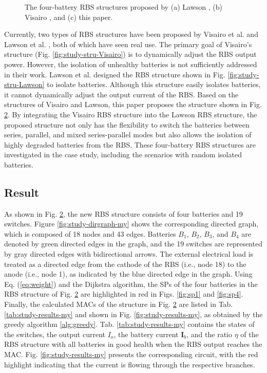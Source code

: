 \documentclass{article}
\begin{document}
\begin{figure}[htbp]
\begin{subfigure}[b]{0.31\textwidth}
        \caption{}
        \label{fig:study-stru-my}
    \end{subfigure}
    \caption{The four-battery RBS structures proposed by (a) Lawson \cite{lawsonSoftwareConfigurableBattery2012}, (b) Visairo \cite{visairoReconfigurableBatteryPack2008}, and (c) this paper.}
\end{figure}

Currently, two types of RBS structures have been proposed by Visairo et al. \cite{visairoReconfigurableBatteryPack2008} and Lawson et al. \cite{lawsonSoftwareConfigurableBattery2012}, both of which have seen real use. 
The primary goal of Visairo's structure (Fig. \ref{fig:study-stru-Visairo}) is to dynamically adjust the RBS output power. However, the isolation of unhealthy batteries is not sufficiently addressed in their work. 
Lawson et al. designed the RBS structure shown in Fig. \ref{fig:study-stru-Lawson} to isolate batteries. 
Although this structure easily isolates batteries, it cannot dynamically adjust the output current of the RBS. 
Based on the structures of Visairo and Lawson, this paper proposes the structure shown in Fig. \ref{fig:study-stru-my}.
By integrating the Visairo RBS structure into the Lawson RBS structure, the proposed structure not only has the flexibility to switch the batteries between series, parallel, and mixed series-parallel modes but also allows the isolation of highly degraded batteries from the RBS.
These four-battery RBS structures are investigated in the case study, including the scenarios with random isolated batteries.

\subsection{Result}

As shown in Fig. \ref{fig:study-stru-my}, the new RBS structure consists of four batteries and 19 switches. 
Figure \ref{fig:study-dirgraph-my} shows the corresponding directed graph, which is composed of 18 nodes and 43 edges. 
Batteries $B_1$, $B_2$, $B_3$, and $B_4$ are denoted by green directed edges in the graph, and the 19 switches are represented by gray directed edges with bidirectional arrows. 
The external electrical load is treated as a directed edge from the cathode of the RBS (i.e., node 18) to the anode (i.e., node 1), as indicated by the blue directed edge in the graph.
Using Eq. (\ref{eq:weight}) and the Dijkstra algorithm, the SPs of the four batteries in the RBS structure of Fig. \ref{fig:study-stru-my} are highlighted in red in Figs. \ref{fig:sp1} and \ref{fig:sp4}.
Finally, the calculated MACs of the structure in Fig. \ref{fig:study-stru-my} are listed in Tab. \ref{tab:study-results-my} and shown in Fig. \ref{fig:study-results-my}, as obtained by the greedy algorithm \ref{alg:greedy}.
Tab. \ref{tab:study-results-my} contains the states of the switches, the output current $I_o$, the battery current $\bm{I}_b$, and the ratio $\eta$ of the RBS structure with all batteries in good health when the RBS output reaches the MAC.
Fig. \ref{fig:study-results-my} presents the corresponding circuit, with the red highlight indicating that the current is flowing through the respective branches.
\end{document}
